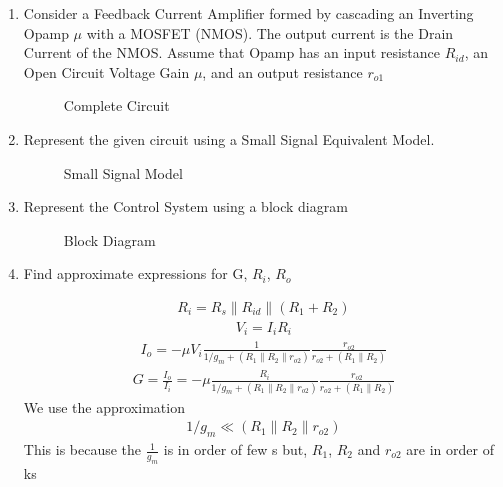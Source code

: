 \begin{enumerate}[label=\thesubsection.\arabic*.,ref=\thesubsection.\theenumi]
\item
Consider a Feedback Current Amplifier formed by cascading an Inverting Opamp $\mu$ with a MOSFET (NMOS).
The output current is the Drain Current of the NMOS.
Assume that Opamp has an input resistance $R_{id}$, an Open Circuit Voltage Gain $\mu$, and an output resistance $r_{o1}$

\begin{figure}[!ht]
	\begin{center}
		\resizebox{\columnwidth}{!}{}
	\end{center}
\caption{Complete Circuit}
\label{fig:Complete_Circuit}
\end{figure}

\item
Represent the given circuit using a Small Signal Equivalent Model.

\solution
\begin{figure}[!ht]
	\begin{center}
		\resizebox{\columnwidth}{!}{}
	\end{center}
\caption{Small Signal Model}
\label{fig:Small_Signal_Model}
\end{figure}

\item
Represent the Control System using a block diagram

\solution
\begin{figure}[!ht]
	\begin{center}
			\resizebox{\columnwidth}{!}{}
	\end{center}
\caption{Block Diagram}
\label{fig:Block_Diagram}
\end{figure}

\item
Find approximate expressions for G, $R_{i}$, $R_{o}$

\solution
\begin{align}
    R_{i}=R_{s}\|R_{i d}\|(R_{1}+R_{2})
\end{align}
\begin{align}
    V_{i}=I_{i} R_{i}
\end{align}
\begin{align}
    I_{o}=-\mu V_{i} \frac{1}{1 / g_{m}+(R_{1}\|R_{2}\| r_{o 2})} \frac{r_{o 2}}{r_{o 2}+(R_{1} \| R_{2})}
\end{align}
\begin{align}
    G = \frac{I_{o}}{I_{i}}=-\mu \frac{R_{i}}{1 / g_{m}+(R_{1}\|R_{2}\| r_{o 2})} \frac{r_{o 2}}{r_{o 2}+(R_{1} \| R_{2})}
\end{align}
We use the approximation
\begin{align}
    1 / g_{m} \ll (R_{1}\|R_{2}\| r_{o 2})
\end{align}
This is because the $\frac{1}{g_{m}}$ is in order of few \ohm s but, $R_{1}$, $R_{2}$ and $r_{o2}$ are in order of k\ohm s 


\end{enumerate}
